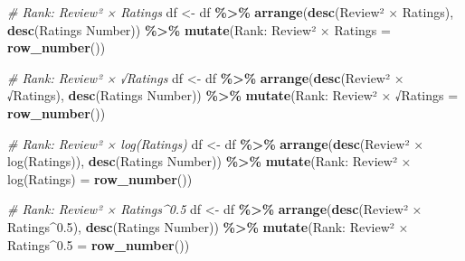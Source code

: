\documentclass[
]{article}
\newenvironment{Shaded}{\begin{snugshade}}{\end{snugshade}}
\newcommand{\AttributeTok}[1]{\textcolor[rgb]{0.13,0.29,0.53}{#1}}
\newcommand{\CommentTok}[1]{\textcolor[rgb]{0.56,0.35,0.01}{\textit{#1}}}
\newcommand{\FunctionTok}[1]{\textcolor[rgb]{0.13,0.29,0.53}{\textbf{#1}}}
\newcommand{\NormalTok}[1]{#1}
\newcommand{\OtherTok}[1]{\textcolor[rgb]{0.56,0.35,0.01}{#1}}
\newcommand{\SpecialCharTok}[1]{\textcolor[rgb]{0.81,0.36,0.00}{\textbf{#1}}}
\newcommand{\StringTok}[1]{\textcolor[rgb]{0.31,0.60,0.02}{#1}}
\begin{document}
\begin{Shaded}
\begin{Highlighting}[]
\CommentTok{\# Rank: Review² × Ratings}
\NormalTok{df }\OtherTok{\textless{}{-}}\NormalTok{ df }\SpecialCharTok{\%\textgreater{}\%}
  \FunctionTok{arrange}\NormalTok{(}\FunctionTok{desc}\NormalTok{(}\StringTok{\textasciigrave{}}\AttributeTok{Review² × Ratings}\StringTok{\textasciigrave{}}\NormalTok{), }\FunctionTok{desc}\NormalTok{(}\StringTok{\textasciigrave{}}\AttributeTok{Ratings Number}\StringTok{\textasciigrave{}}\NormalTok{)) }\SpecialCharTok{\%\textgreater{}\%}
  \FunctionTok{mutate}\NormalTok{(}\StringTok{\textasciigrave{}}\AttributeTok{Rank: Review² × Ratings}\StringTok{\textasciigrave{}} \OtherTok{=} \FunctionTok{row\_number}\NormalTok{())}

\CommentTok{\# Rank: Review² × √Ratings}
\NormalTok{df }\OtherTok{\textless{}{-}}\NormalTok{ df }\SpecialCharTok{\%\textgreater{}\%}
  \FunctionTok{arrange}\NormalTok{(}\FunctionTok{desc}\NormalTok{(}\StringTok{\textasciigrave{}}\AttributeTok{Review² × √Ratings}\StringTok{\textasciigrave{}}\NormalTok{), }\FunctionTok{desc}\NormalTok{(}\StringTok{\textasciigrave{}}\AttributeTok{Ratings Number}\StringTok{\textasciigrave{}}\NormalTok{)) }\SpecialCharTok{\%\textgreater{}\%}
  \FunctionTok{mutate}\NormalTok{(}\StringTok{\textasciigrave{}}\AttributeTok{Rank: Review² × √Ratings}\StringTok{\textasciigrave{}} \OtherTok{=} \FunctionTok{row\_number}\NormalTok{())}

\CommentTok{\# Rank: Review² × log(Ratings)}
\NormalTok{df }\OtherTok{\textless{}{-}}\NormalTok{ df }\SpecialCharTok{\%\textgreater{}\%}
  \FunctionTok{arrange}\NormalTok{(}\FunctionTok{desc}\NormalTok{(}\StringTok{\textasciigrave{}}\AttributeTok{Review² × log(Ratings)}\StringTok{\textasciigrave{}}\NormalTok{), }\FunctionTok{desc}\NormalTok{(}\StringTok{\textasciigrave{}}\AttributeTok{Ratings Number}\StringTok{\textasciigrave{}}\NormalTok{)) }\SpecialCharTok{\%\textgreater{}\%}
  \FunctionTok{mutate}\NormalTok{(}\StringTok{\textasciigrave{}}\AttributeTok{Rank: Review² × log(Ratings)}\StringTok{\textasciigrave{}} \OtherTok{=} \FunctionTok{row\_number}\NormalTok{())}

\CommentTok{\# Rank: Review² × Ratings\^{}0.5}
\NormalTok{df }\OtherTok{\textless{}{-}}\NormalTok{ df }\SpecialCharTok{\%\textgreater{}\%}
  \FunctionTok{arrange}\NormalTok{(}\FunctionTok{desc}\NormalTok{(}\StringTok{\textasciigrave{}}\AttributeTok{Review² × Ratings\^{}0.5}\StringTok{\textasciigrave{}}\NormalTok{), }\FunctionTok{desc}\NormalTok{(}\StringTok{\textasciigrave{}}\AttributeTok{Ratings Number}\StringTok{\textasciigrave{}}\NormalTok{)) }\SpecialCharTok{\%\textgreater{}\%}
  \FunctionTok{mutate}\NormalTok{(}\StringTok{\textasciigrave{}}\AttributeTok{Rank: Review² × Ratings\^{}0.5}\StringTok{\textasciigrave{}} \OtherTok{=} \FunctionTok{row\_number}\NormalTok{())}
\end{Highlighting}
\end{Shaded}
\end{document}
